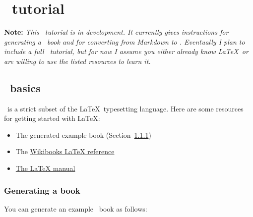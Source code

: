 \chapter{\PolyTeX\ tutorial} %
\label{cha:polytex_tutorial}

\noindent \textbf{Note:} \emph{This \PolyTeX\ tutorial is in development. It currently gives instructions for generating a \PolyTeX\ book and for converting from Markdown to \PolyTeX\@. Eventually I plan to include a full \PolyTeX\ tutorial, but for now I assume you either already know \LaTeX\ or are willing to use the listed resources to learn it.}

\section{\PolyTeX\ basics} %
\label{sec:polytex_basics}

\PolyTeX\ is a strict subset of the \LaTeX\ typesetting language. Here are some resources for getting started with \LaTeX:

\begin{itemize}
\item The generated example book (Section~\ref{sec:generating_a_polytex_book})
\item The \href{http://en.wikibooks.org/wiki/LaTeX}{Wikibooks LaTeX reference}
\item \href{https://www.google.com/search?q=latex+a+document+preparation+system+site:temple.edu}{The LaTeX manual}
\end{itemize}



\subsection{Generating a \PolyTeX book} %
\label{sec:generating_a_polytex_book}

You can generate an example \PolyTeX\ book as follows:




